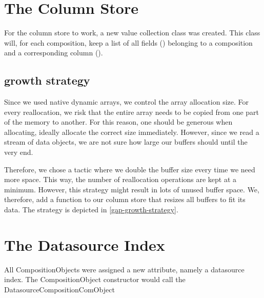 \section{The Column Store}
\label{sec:The CompositionComObjValueCollection}
For the column store to work, a new value collection class was created. This class will, for each composition, keep a list of all fields () belonging to a composition and a corresponding column ().

\subsection{ growth strategy}
\label{sub:FieldValueCollection growth strategy}
Since we used native dynamic arrays, we control the array allocation size. For every reallocation, we risk that the entire array needs to be copied from one part of the memory to another. For this reason, one should be generous when allocating, ideally allocate the correct size immediately. However, since we read a stream of data objects, we are not sure how large our buffers should until the very end. 

Therefore, we chose a tactic where we double the buffer size every time we need more space. This way, the number of reallocation operations are kept at a minimum. However, this strategy might result in lots of unused buffer space. We, therefore, add a  function to our column store that resizes all buffers to fit its data. The strategy is depicted in \ref{gap-growth-strategy}.




\section{The Datasource Index}
\label{sec:The Datasource Index}
All CompositionObjects were assigned a new attribute, namely a datasource index. The CompositionObject constructor would call the DatasourceCompositionComObject

